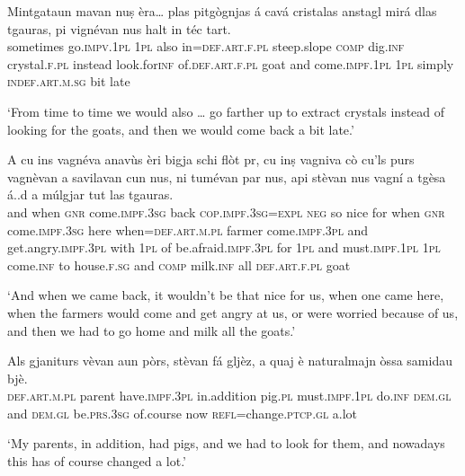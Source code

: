 \begin{linenumbers}
\gll    Mintgataun mavan nuṣ èra… plas pitgògnjas á cavá cristalas anstagl mirá dlas tgauras, pi vignévan nus halt in téc tart. \\
sometimes go.\textsc{impv.1pl} \textsc{1pl} also in=\textsc{def.art.f.pl} steep.slope \textsc{comp} dig.\textsc{inf} crystal.\textsc{f.pl} instead look.for\textsc{inf}  of.\textsc{def.art.f.pl} goat and come.\textsc{impf.1pl} \textsc{1pl} simply \textsc{indef.art.m.sg} bit late \\
\end{linenumbers}
\medskip
\glt `From time to time we would also … go farther up to extract crystals instead of looking for the goats, and then we would come back a bit late.'
\medskip

\begin{linenumbers}
\gll    A cu ins vagnéva anavùs èri bigja schi flòt pr, cu inṣ vagniva cò cu’ls purs vagnèvan a savilavan cun nus, ni tumévan par nus, api stèvan nus vagní a tgèsa á..d a múlgjar tut las tgauras.\\
and when \textsc{gnr} come.\textsc{impf.3sg} back \textsc{cop.impf.3sg=expl} \textsc{neg} so nice for when \textsc{gnr} come.\textsc{impf.3sg} here when=\textsc{def.art.m.pl} farmer come.\textsc{impf.3pl} and get.angry.\textsc{impf.3pl} with \textsc{1pl} of be.afraid.\textsc{impf.3pl} for \textsc{1pl} and must.\textsc{impf.1pl} \textsc{1pl} come.\textsc{inf} to house.\textsc{f.sg} and \textsc{comp} milk.\textsc{inf} all \textsc{def.art.f.pl} goat\\
\end{linenumbers}
\medskip
\glt `And when we came back, it wouldn’t be that nice for us, when one came here, when the farmers would come and get angry at us, or were worried because of us, and then we had to go home and milk all the goats.'
\medskip

\begin{linenumbers}
\gll Als gjaniturs vèvan aun pòrs, stèvan fá gljèz, a quaj è naturalmajn òssa samidau bjè. \\
 \textsc{def.art.m.pl} parent have.\textsc{impf.3pl} in.addition pig.\textsc{pl} must.\textsc{impf.1pl} do.\textsc{inf} \textsc{dem.gl} and \textsc{dem.gl} be.\textsc{prs.3sg} of.course now \textsc{refl=}change.\textsc{ptcp.gl} a.lot\\
\end{linenumbers}
\medskip
\glt `My parents, in addition, had pigs, and we had to look for them, and nowadays this has of course changed a lot.'
\medskip


